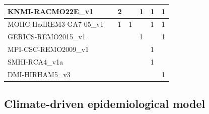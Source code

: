 \begin{table}[H]
{\begin{tabular}{l|l|l|l|l|l|l}
            \hline
            KNMI-RACMO22E\_v1                &              & 2          &
                                             & 1            & 1          & 1
            \\
            \hline
            MOHC-HadREM3-GA7-05\_v1          &              & 1          & 1
                                             &              & 1          & 1
            \\
            \hline
            GERICS-REMO2015\_v1              &              &            &
                                             & 1            &            & 1
            \\
            \hline
            MPI-CSC-REMO2009\_v1             &              &            &
                                             &              & 1          &
            \\
            \hline
            SMHI-RCA4\_v1a                   &              &            &
                                             &              & 1          &
            \\
            \hline
            DMI-HIRHAM5\_v3                  &              &            &
                                             &              &            & 1
            \\
            \hline
        \end{tabular}%
    }
\end{table}

\subsection{Climate-driven epidemiological model}

